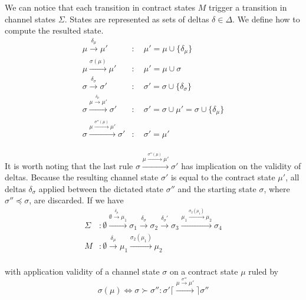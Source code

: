 \documentclass{llncs}
\begin{document}
We can notice that each transition in contract states $M$ trigger a transition in channel states $\Sigma$. States are represented as sets of deltas $\delta \in \Delta$. We define how to compute the resulted state.
\begin{equation*}
\begin{split}
    \mu \xrightarrow{\delta_\mu} \mu' &: \quad \mu' = \mu \cup \{\delta_\mu\} \\
    \mu \xrightarrow{\sigma(\mu)} \mu' &: \quad \mu' = \mu \cup \sigma \\
    \sigma \xrightarrow{\delta_\sigma} \sigma' &: \quad \sigma' = \sigma \cup \{ \delta_\sigma \}  \\
    \sigma \xrightarrow{\mu \xrightarrow{\delta_\mu} \mu'} \sigma' &: \quad \sigma' =  \sigma \cup \mu' = \sigma \cup \{ \delta_\mu \} \\
    \sigma \xrightarrow{\mu \xrightarrow{\sigma''(\mu)} \mu'} \sigma' &: \quad \sigma' = \mu' \\
\end{split}
\end{equation*}

It is worth noting that the last rule $\sigma \xrightarrow{\mu \xrightarrow{\sigma''(\mu)} \mu'} \sigma'$ has implication on the validity of deltas. Because the resulting channel state $\sigma'$ is equal to the contract state $\mu'$, all deltas $\delta_\sigma$ applied between the dictated state $\sigma''$ and the starting state $\sigma$, where $\sigma'' \preceq \sigma$, are discarded. If we have
\begin{equation*}
\begin{split}
    \Sigma&: \emptyset \xrightarrow{\emptyset \xrightarrow{\delta_\mu} \mu_1} \sigma_1 \xrightarrow{\delta_\sigma} \sigma_2 \xrightarrow{\delta_\sigma'} \sigma_3 \xrightarrow{\mu_1 \xrightarrow{\sigma_2(\mu_1)} \mu_2} \sigma_4\\
    M&: \emptyset \xrightarrow{\delta_\mu} \mu_1 \xrightarrow{\sigma_2(\mu_1)} \mu_2 \\
\end{split}
\end{equation*}

with application validity of a channel state $\sigma$ on a contract state $\mu$ ruled by
$$\sigma(\mu) \iff \sigma \succ \sigma'' : \sigma' \lceil \xrightarrow{\mu \xrightarrow{\sigma'''} \mu'} \rceil \sigma''$$

\end{document}
